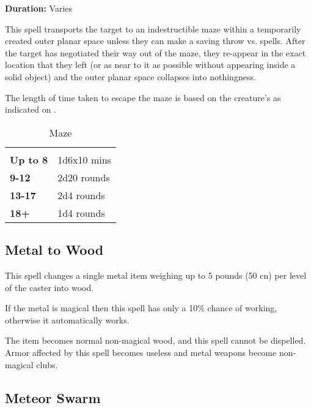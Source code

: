 \begin{multicols*}{2}
{\textbf{Duration:} Varies}

This spell transports the target to an indestructible maze within a temporarily created outer planar space unless they can make a saving throw vs. spells. After the target has negotiated their way out of the maze, they re-appear in the exact location that they left (or as near to it as possible without appearing inside a solid object) and the outer planar space collapses into nothingness.

The length of time taken to escape the maze is based on the creature’s  as indicated on .

\begin {table}[H]
	\caption{Maze}\label{tab:Maze}
  \begin{tabularx}{\columnwidth}{>{\bfseries}YY}
	 & \\
	Up to 8 & 1d6x10 mins\\
	9-12 & 2d20 rounds\\
	13-17 & 2d4 rounds\\
	18+ & 1d4 rounds
  \end {tabularx}
\end {table}

\subsection{Metal to Wood}\label{spell:Metal to Wood}

This spell changes a single metal item weighing up to 5 pounds (50 cn) per level of the caster into wood.

If the metal is magical then this spell has only a 10\% chance of working, otherwise it automatically works.

The item becomes normal non-magical wood, and this spell cannot be dispelled. Armor affected by this spell becomes useless and metal weapons become non-magical clubs.

\subsection{Meteor Swarm}\label{spell:Meteor Swarm}
\end{multicols*}
